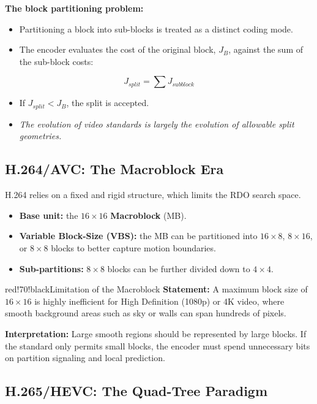\textbf{The block partitioning problem:}

\begin{itemize}
\item Partitioning a block into sub-blocks is treated as a distinct coding mode.
\item The encoder evaluates the cost of the original block, $J_B$, against the sum of the sub-block costs:
\end{itemize}

\[
J_{split} = \sum J_{subblock}
\]

\begin{itemize}
\item If $J_{split} < J_B$, the split is accepted.
\item \textit{The evolution of video standards is largely the evolution of allowable split geometries.}
\end{itemize}

\subsection{H.264/AVC: The Macroblock Era}

H.264 relies on a fixed and rigid structure, which limits the RDO search space.

\begin{itemize}
\item \textbf{Base unit:} the $16 \times 16$ \textbf{Macroblock} (MB).
\item \textbf{Variable Block-Size (VBS):} the MB can be partitioned into $16 \times 8$, $8 \times 16$, or $8 \times 8$ blocks to better capture motion boundaries.
\item \textbf{Sub-partitions:} $8 \times 8$ blocks can be further divided down to $4 \times 4$.
\end{itemize}

\begin{calloutbox}{red!70!black}{Limitation of the Macroblock}
\textbf{Statement:} A maximum block size of $16 \times 16$ is highly inefficient for High Definition (1080p) or 4K video, where smooth background areas such as sky or walls can span hundreds of pixels.

\textbf{Interpretation:} Large smooth regions should be represented by large blocks. If the standard only permits small blocks, the encoder must spend unnecessary bits on partition signaling and local prediction.
\end{calloutbox}

\subsection{H.265/HEVC: The Quad-Tree Paradigm}

